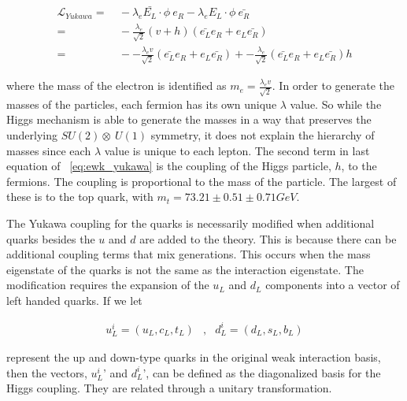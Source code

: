 \begin{equation}\label{eq:ewk_yukawa}
\begin{aligned}
\mathcal{L}_{Yukawa} =&~ -\lambda_{e}\bar{E_{L}}\cdot\phi~e_{R} -
\lambda_{e}E_{L}\cdot\phi~\bar{e_{R}} \\
=&~ -\frac{\lambda_{e}}{\sqrt{2}}(v+h)(\bar{e_{L}}e_{R} +
  e_{L}\bar{e_{R}}) \\
=&~ --\frac{\lambda_{e}v}{\sqrt{2}}(\bar{e_{L}}e_{R} +
  e_{L}\bar{e_{R}}) + -\frac{\lambda_{e}}{\sqrt{2}}(\bar{e_{L}}e_{R} +
  e_{L}\bar{e_{R}})h
\end{aligned}
\end{equation}

\noindent where the mass of the electron is identified as $m_{e} =
\frac{\lambda_{e}v}{\sqrt{2}}$.  In order to generate the masses of
the particles, each fermion has its own unique $\lambda$ value.  So
while the Higgs mechanism is able to generate the masses in a way that
preserves the underlying $SU(2)\otimes~U(1)$ symmetry, it does not
explain the hierarchy of masses since each $\lambda$ value is unique
to each lepton.  The second term in last equation of
~\ref{eq:ewk_yukawa} is the coupling of the Higgs particle, $h$, to
the fermions.  The coupling is proportional to the mass of the
particle.  The largest of these is to the top quark, with $m_{t} =
73.21 \pm 0.51 \pm 0.71 GeV$.

\par The Yukawa coupling for the quarks is necessarily modified when
additional quarks besides the $u$ and $d$ are added to the theory.
This is because there can be additional coupling terms that mix
generations.  This occurs when the mass eigenstate of the quarks is
not the same as the interaction eigenstate.  The modification requires
the expansion of the $u_{L}$ and $d_{L}$ components into a vector of
left handed quarks.  If we let

\begin{equation}\label{eq:ewk_quark_vector}
\begin{aligned}
u_{L}^{i} = (u_{L}, c_{L}, t_{L}) &,                 & d_{L}^{i} = (d_{L}, s_{L}, b_{L})
\end{aligned}
\end{equation}

\noindent represent the up and down-type quarks in the original weak
interaction basis, then the vectors, $u_{L}^{i}$' and $d_{L}^{i}$',
can be defined as the diagonalized basis for the Higgs coupling.  They
are related through a unitary transformation.  

